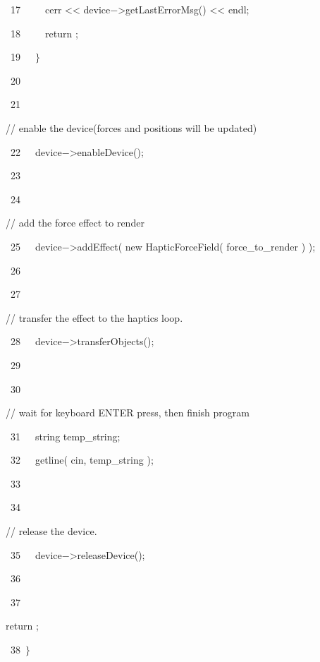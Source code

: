 {{\hlline \ \ \ 17\ }{\hlstd }{\hlstd\ \ \ \ }{\hlstd cerr }{\hlsym $\mathord{<}$$\mathord{<}$ }{\hlstd device}{\hlsym $\mathord{-}$$\mathord{>}$}{\hlstd }{\hlkwd getLastErrorMsg}{\hlstd }{\hlsym () $\mathord{<}$$\mathord{<}$ }{\hlstd endl}{\hlsym ;}\leavevmode\par
{\hlline \ \ \ 18\ }{\hlstd }{\hlstd\ \ \ \ }{\hlstd }{\hlkwa return }{\hlstd }{}{\hlstd }{\hlsym ;}\leavevmode\par
{\hlline \ \ \ 19\ }{\hlstd }{\hlstd\ \ }{\hlstd }{\hlsym $\}$}\leavevmode\par
{\hlline \ \ \ 20\ }{\hlstd \leavevmode\par
{\hlline \ \ \ 21\ }}{\hlstd\ \ }{\hlstd }{\hlslc // enable the device(forces and positions will be updated)}\leavevmode\par
{\hlline \ \ \ 22\ }{\hlstd }{\hlstd\ \ }{\hlstd device}{\hlsym $\mathord{-}$$\mathord{>}$}{\hlstd }{\hlkwd enableDevice}{\hlstd }{\hlsym ();}\leavevmode\par
{\hlline \ \ \ 23\ }{\hlstd \leavevmode\par
{\hlline \ \ \ 24\ }}{\hlstd\ \ }{\hlstd }{\hlslc // add the force effect to render}\leavevmode\par
{\hlline \ \ \ 25\ }{\hlstd }{\hlstd\ \ }{\hlstd device}{\hlsym $\mathord{-}$$\mathord{>}$}{\hlstd }{\hlkwd addEffect}{\hlstd }{\hlsym ( }{\hlstd }{\hlkwa new }{\hlstd }{\hlkwd HapticForceField}{\hlstd }{\hlsym ( }{\hlstd force\_{}to\_{}render }{\hlsym ) );}\leavevmode\par
{\hlline \ \ \ 26\ }{\hlstd \leavevmode\par
{\hlline \ \ \ 27\ }}{\hlstd\ \ }{\hlstd }{\hlslc // transfer the effect to the haptics loop.}\leavevmode\par
{\hlline \ \ \ 28\ }{\hlstd }{\hlstd\ \ }{\hlstd device}{\hlsym $\mathord{-}$$\mathord{>}$}{\hlstd }{\hlkwd transferObjects}{\hlstd }{\hlsym ();}\leavevmode\par
{\hlline \ \ \ 29\ }{\hlstd \leavevmode\par
{\hlline \ \ \ 30\ }}{\hlstd\ \ }{\hlstd }{\hlslc // wait for keyboard ENTER press, then finish program}\leavevmode\par
{\hlline \ \ \ 31\ }{\hlstd }{\hlstd\ \ }{\hlstd string temp\_{}string}{\hlsym ;}\leavevmode\par
{\hlline \ \ \ 32\ }{\hlstd }{\hlstd\ \ }{\hlstd }{\hlkwd getline}{\hlstd }{\hlsym ( }{\hlstd cin}{\hlsym , }{\hlstd temp\_{}string }{\hlsym );}\leavevmode\par
{\hlline \ \ \ 33\ }{\hlstd \leavevmode\par
{\hlline \ \ \ 34\ }}{\hlstd\ \ }{\hlstd }{\hlslc // release the device.}\leavevmode\par
{\hlline \ \ \ 35\ }{\hlstd }{\hlstd\ \ }{\hlstd device}{\hlsym $\mathord{-}$$\mathord{>}$}{\hlstd }{\hlkwd releaseDevice}{\hlstd }{\hlsym ();}\leavevmode\par
{\hlline \ \ \ 36\ }{\hlstd \leavevmode\par
{\hlline \ \ \ 37\ }}{\hlstd\ \ }{\hlstd }{\hlkwa return }{\hlstd }{}{\hlstd }{\hlsym ;}\leavevmode\par
{\hlline \ \ \ 38\ }{\hlstd }{\hlsym $\}$}{\hlstd }\leavevmode\par
}
